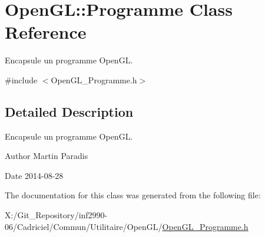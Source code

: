 \hypertarget{class_open_g_l_1_1_programme}{\section{Open\-G\-L\-:\-:Programme Class Reference}
\label{class_open_g_l_1_1_programme}
}


Encapsule un programme Open\-G\-L.  




{\ttfamily \#include $<$Open\-G\-L\-\_\-\-Programme.\-h$>$}



\subsection{Detailed Description}
Encapsule un programme Open\-G\-L. 

\begin{DoxyAuthor}{Author}
Martin Paradis 
\end{DoxyAuthor}
\begin{DoxyDate}{Date}
2014-\/08-\/28 
\end{DoxyDate}


The documentation for this class was generated from the following file\-:\begin{DoxyCompactItemize}
\item 
X\-:/\-Git\-\_\-\-Repository/inf2990-\/06/\-Cadriciel/\-Commun/\-Utilitaire/\-Open\-G\-L/\hyperlink{_open_g_l___programme_8h}{Open\-G\-L\-\_\-\-Programme.\-h}\end{DoxyCompactItemize}
